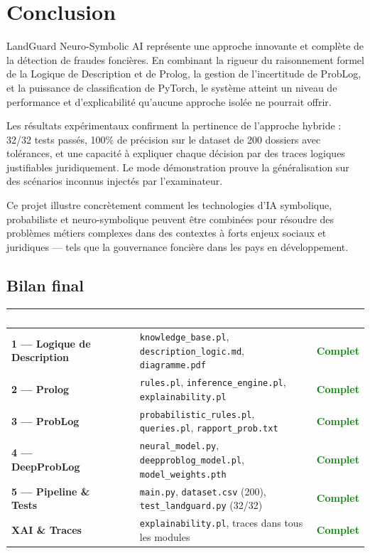 \documentclass[11pt,a4paper]{report}
\begin{document}
\chapter*{Conclusion}

LandGuard Neuro-Symbolic AI représente une approche innovante et complète de la
détection de fraudes foncières. En combinant la rigueur du raisonnement formel
de la Logique de Description et de Prolog, la gestion de l'incertitude de ProbLog,
et la puissance de classification de PyTorch, le système atteint un niveau de
performance et d'explicabilité qu'aucune approche isolée ne pourrait offrir.

Les résultats expérimentaux confirment la pertinence de l'approche hybride :
32/32 tests passés, 100\% de précision sur le dataset de 200 dossiers avec
tolérances, et une capacité à expliquer chaque décision par des traces logiques
justifiables juridiquement. Le mode démonstration prouve la généralisation sur
des scénarios inconnus injectés par l'examinateur.

Ce projet illustre concrètement comment les technologies d'IA symbolique,
probabiliste et neuro-symbolique peuvent être combinées pour résoudre des
problèmes métiers complexes dans des contextes à forts enjeux sociaux et
juridiques --- tels que la gouvernance foncière dans les pays en développement.

\vspace{1cm}
\section*{Bilan final}

\begin{center}
\begin{tabular}{>{\bfseries}p{4.5cm} >{\bfseries}p{1.2cm} p{6.5cm} >{\bfseries}p{1.8cm}}
\toprule
\rowcolor{tablehead}\textcolor{white}{Partie} & \textcolor{white}{Pts} & \textcolor{white}{Livrables} & \textcolor{white}{Statut} \\
\midrule
1 --- Logique de Description &  & \texttt{knowledge\_base.pl}, \texttt{description\_logic.md}, \texttt{diagramme.pdf} & \textcolor{green}{Complet} \\
2 --- Prolog &  & \texttt{rules.pl}, \texttt{inference\_engine.pl}, \texttt{explainability.pl} & \textcolor{green}{Complet} \\
3 --- ProbLog &  & \texttt{probabilistic\_rules.pl}, \texttt{queries.pl}, \texttt{rapport\_prob.txt} & \textcolor{green}{Complet} \\
4 --- DeepProbLog &  & \texttt{neural\_model.py}, \texttt{deepproblog\_model.pl}, \texttt{model\_weights.pth} & \textcolor{green}{Complet} \\
5 --- Pipeline \& Tests &  & \texttt{main.py}, \texttt{dataset.csv} (200), \texttt{test\_landguard.py} (32/32) & \textcolor{green}{Complet} \\
XAI \& Traces & & \texttt{explainability.pl}, traces dans tous les modules & \textcolor{green}{Complet} \\

\bottomrule
\end{tabular}
\end{center}
\end{document}
